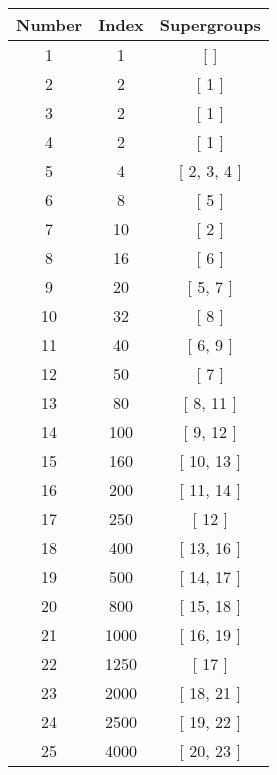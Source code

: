 \begin{center}
\begin{longtable}[H]{|| c c c ||}
\hline
Number & Index & Supergroups \\ 
\hline
1 & 1 & [  ] \\ 
\hline
2 & 2 & [ 1 ] \\ 
\hline
3 & 2 & [ 1 ] \\ 
\hline
4 & 2 & [ 1 ] \\ 
\hline
5 & 4 & [ 2, 3, 4 ] \\ 
\hline
6 & 8 & [ 5 ] \\ 
\hline
7 & 10 & [ 2 ] \\ 
\hline
8 & 16 & [ 6 ] \\ 
\hline
9 & 20 & [ 5, 7 ] \\ 
\hline
10 & 32 & [ 8 ] \\ 
\hline
11 & 40 & [ 6, 9 ] \\ 
\hline
12 & 50 & [ 7 ] \\ 
\hline
13 & 80 & [ 8, 11 ] \\ 
\hline
14 & 100 & [ 9, 12 ] \\ 
\hline
15 & 160 & [ 10, 13 ] \\ 
\hline
16 & 200 & [ 11, 14 ] \\ 
\hline
17 & 250 & [ 12 ] \\ 
\hline
18 & 400 & [ 13, 16 ] \\ 
\hline
19 & 500 & [ 14, 17 ] \\ 
\hline
20 & 800 & [ 15, 18 ] \\ 
\hline
21 & 1000 & [ 16, 19 ] \\ 
\hline
22 & 1250 & [ 17 ] \\ 
\hline
23 & 2000 & [ 18, 21 ] \\ 
\hline
24 & 2500 & [ 19, 22 ] \\ 
\hline
25 & 4000 & [ 20, 23 ] \\ 
\hline
\end{longtable}
\end{center}
